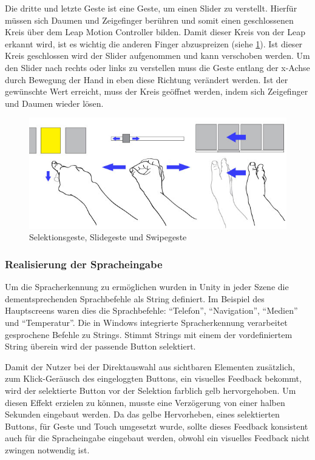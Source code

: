 Die dritte und letzte Geste ist eine Geste, um einen Slider zu verstellt. 
Hierfür müssen sich Daumen und Zeigefinger berühren und somit einen geschlossenen Kreis über dem Leap Motion Controller bilden.
Damit dieser Kreis von der Leap erkannt wird, ist es wichtig die anderen Finger abzuspreizen (siehe \ref{fig:Gestures}). 
Ist dieser Kreis geschlossen wird der Slider aufgenommen und kann verschoben werden. 
Um den Slider nach rechts oder links zu verstellen muss die Geste entlang der x-Achse durch Bewegung der Hand in eben diese Richtung verändert werden. 
Ist der gewünschte Wert erreicht, muss der Kreis geöffnet werden, indem sich Zeigefinger und Daumen wieder lösen. 
\begin{figure}[ht]
	\centering
		\includegraphics[width=1\textwidth]{img/Gestures-mit_Pfeile.jpg}
	\caption{Selektionsgeste, Slidegeste und Swipegeste}
	\label{fig:Gestures}
\end{figure}

\subsubsection[Sprache]{Realisierung der Spracheingabe}
Um die Spracherkennung zu ermöglichen wurden in Unity in jeder Szene die dementsprechenden Sprachbefehle als String definiert. 
Im Beispiel des Hauptscreens waren dies die Sprachbefehle: "`Telefon"', "`Navigation"', "`Medien"' und "`Temperatur"'. 
Die in Windows integrierte Spracherkennung verarbeitet gesprochene Befehle zu Strings.
Stimmt Strings mit einem der vordefiniertem String überein wird der passende Button selektiert. 

Damit der Nutzer bei der Direktauswahl aus sichtbaren Elementen zusätzlich, zum Klick-Geräusch des eingeloggten Buttons, ein visuelles Feedback bekommt, wird der selektierte Button vor der Selektion farblich gelb hervorgehoben. 
Um diesen Effekt erzielen zu können, musste eine Verzögerung von einer halben Sekunden eingebaut werden.
Da das gelbe Hervorheben, eines selektierten Buttons, für Geste und Touch umgesetzt wurde, sollte dieses Feedback konsistent auch für die Spracheingabe eingebaut werden, obwohl ein visuelles Feedback nicht zwingen notwendig ist.


